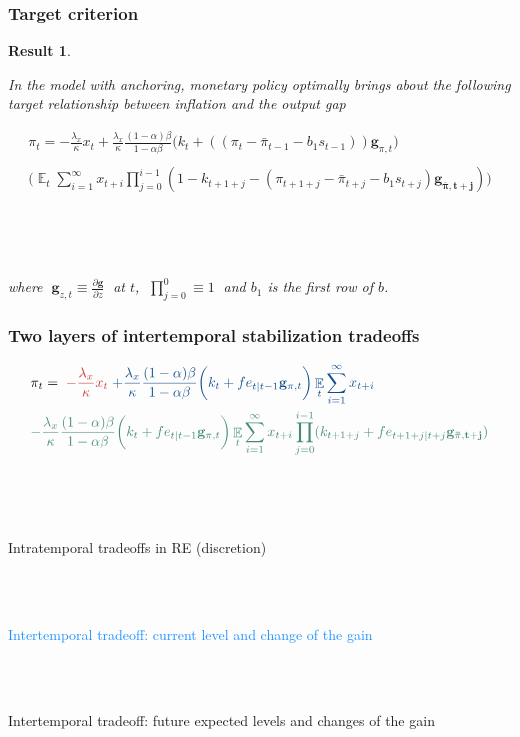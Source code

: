\documentclass[10pt]{beamer}
\DeclareMathOperator{\E}{\mathbb{E}}
\newtheorem{result}{Result}
\begin{document}
\begin{frame}
	\frametitle{Target criterion}
	\label{anchTC}
	
	\begin{result} 

\

In the model with anchoring, monetary policy optimally brings about the following target relationship between inflation and the output gap
	
\begin{align*}
\pi_t  = -\frac{\lambda_x}{\kappa}x_t + \frac{\lambda_x}{\kappa}\frac{(1-\alpha)\beta}{1-\alpha\beta} \bigg(k_t+((\pi_t - \bar{\pi}_{t-1}-b_1 s_{t-1}))\mathbf{g}_{\pi,t}\bigg) \\
\\
\bigg(\E_t\sum_{i=1}^{\infty}x_{t+i}\prod_{j=0}^{i-1}(1-k_{t+1+j} - (\pi_{t+1+j} - \bar{\pi}_{t+j}-b_1 s_{t+j})\mathbf{g_{\bar{\pi}, t+j}}) \bigg)
 \label{target}
\end{align*}

\

\

where $\; \mathbf{g}_{z,t} \equiv \frac{\partial \mathbf{g}}{\partial z}\;$ at $t$, $\; \prod_{j=0}^{0} \equiv 1 \; $ and $b_1$ is the first row of $b$.
	\end{result}

\vspace{-0.1cm}

\hfill \hyperlink{generalTC}{}

\end{frame}

\begin{frame}
	\frametitle{Two layers of intertemporal stabilization tradeoffs}
\small{
\begin{align*}
& \pi_t  =  \; \textcolor{brownreddark}{-\frac{\lambda_x}{\kappa} x_t} \textcolor{dodgerblue}{ \; + \frac{\lambda_x}{\kappa} \frac{(1-\alpha)\beta}{1-\alpha\beta} \bigg(k_t+ fe_{t|t-1}\mathbf{g}_{\pi,t} \bigg)\E_t\sum_{i=1}^{\infty}x_{t+i}}  \\
& \textcolor{aquamarinegreen}{- \frac{\lambda_x}{\kappa} \frac{(1-\alpha)\beta}{1-\alpha\beta} \bigg(k_t+ fe_{t|t-1}\mathbf{g}_{\pi,t} \bigg)\E_t\sum_{i=1}^{\infty}x_{t+i}\prod_{j=0}^{i-1}(k_{t+1+j}+ fe_{t+1+j|t+j}\mathbf{g_{\bar{\pi},t+j}} )}
\end{align*}

\

\

\textcolor{brownreddark}{Intratemporal tradeoffs in RE (discretion)} \\

\

\

\textcolor{dodgerblue}{Intertemporal tradeoff: current level and change of the gain } \\

\

\

\textcolor{aquamarinegreen}{Intertemporal tradeoff: future expected levels and changes of the gain}

}
\end{frame}
\end{document}
